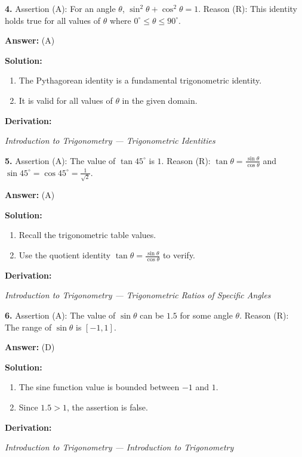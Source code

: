 \documentclass[12pt,a4paper]{exam}
\newcommand{\fitmath}[1]{%
  \sbox{\schmathbox}{$\displaystyle #1$}%
  \ifdim\wd\schmathbox>\linewidth
    \resizebox{\linewidth}{!}{\usebox{\schmathbox}}%
  \else
    \usebox{\schmathbox}%
  \fi}
\begin{document}
\begin{questions}
\question \textbf{4.} Assertion (A): For an angle $\theta$, $\sin^2 \theta + \cos^2 \theta = 1$. Reason (R): This identity holds true for all values of $\theta$ where $0^\circ \le \theta \le 90^\circ$.

\textbf{Answer:}
(A)

\textbf{Solution:}
\begin{enumerate}
  \item The Pythagorean identity is a fundamental trigonometric identity.
  \item It is valid for all values of $\theta$ in the given domain.
\end{enumerate}
\textbf{Derivation:}
\begin{center}
\fitmath{\sin^2 \theta + \cos^2 \theta = 1 \text{ for all } \theta}
\end{center}
\hfill \textit{Introduction to Trigonometry — Trigonometric Identities}
\vspace{0.3cm}

\question \textbf{5.} Assertion (A): The value of $\tan 45^\circ$ is $1$. Reason (R): $\tan \theta = \frac{\sin \theta}{\cos \theta}$ and $\sin 45^\circ = \cos 45^\circ = \frac{1}{\sqrt{2}}$.

\textbf{Answer:}
(A)

\textbf{Solution:}
\begin{enumerate}
  \item Recall the trigonometric table values.
  \item Use the quotient identity $\tan \theta = \frac{\sin \theta}{\cos \theta}$ to verify.
\end{enumerate}
\textbf{Derivation:}
\begin{center}
\fitmath{\tan 45^\circ = \frac{\sin 45^\circ}{\cos 45^\circ} = \frac{1/\sqrt{2}}{1/\sqrt{2}} = 1}
\end{center}
\hfill \textit{Introduction to Trigonometry — Trigonometric Ratios of Specific Angles}
\vspace{0.3cm}

\question \textbf{6.} Assertion (A): The value of $\sin \theta$ can be $1.5$ for some angle $\theta$. Reason (R): The range of $\sin \theta$ is $[-1, 1]$.

\textbf{Answer:}
(D)

\textbf{Solution:}
\begin{enumerate}
  \item The sine function value is bounded between $-1$ and $1$.
  \item Since $1.5 > 1$, the assertion is false.
\end{enumerate}
\textbf{Derivation:}
\begin{center}
\fitmath{-1 \le \sin \theta \le 1}
\end{center}
\hfill \textit{Introduction to Trigonometry — Introduction to Trigonometry}
\vspace{0.3cm}


\end{questions}
\end{document}
